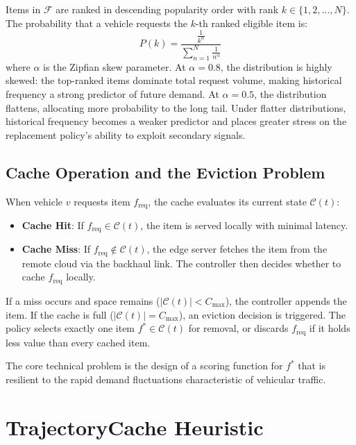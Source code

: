 \documentclass[preprint,12pt]{elsarticle}
\begin{document}
	Items in $\mathcal{F}$ are ranked in descending popularity order with rank $k \in \{1, 2, \dots, N\}$. The probability that a vehicle requests the $k$-th ranked eligible item is:
	\begin{equation}
		P(k) = \frac{\frac{1}{k^\alpha}}{\sum_{n=1}^{N} \frac{1}{n^\alpha}}
		\label{eq:zipf}
	\end{equation}
	where $\alpha$ is the Zipfian skew parameter. At $\alpha = 0.8$, the distribution is highly skewed: the top-ranked items dominate total request volume, making historical frequency a strong predictor of future demand. At $\alpha = 0.5$, the distribution flattens, allocating more probability to the long tail. Under flatter distributions, historical frequency becomes a weaker predictor and places greater stress on the replacement policy's ability to exploit secondary signals.
	
	\subsection{Cache Operation and the Eviction Problem}
	
	When vehicle $v$ requests item $f_\text{req}$, the cache evaluates its current state $\mathcal{C}(t)$:
	\begin{itemize}
		\item \textbf{Cache Hit}: If $f_\text{req} \in \mathcal{C}(t)$, the item is served locally with minimal latency.
		\item \textbf{Cache Miss}: If $f_\text{req} \notin \mathcal{C}(t)$, the edge server fetches the item from the remote cloud via the backhaul link. The controller then decides whether to cache $f_\text{req}$ locally.
	\end{itemize}
	
	If a miss occurs and space remains ($|\mathcal{C}(t)| < C_\text{max}$), the controller appends the item. If the cache is full ($|\mathcal{C}(t)| = C_\text{max}$), an eviction decision is triggered. The policy selects exactly one item $f^* \in \mathcal{C}(t)$ for removal, or discards $f_\text{req}$ if it holds less value than every cached item.
	
	The core technical problem is the design of a scoring function for $f^*$ that is resilient to the rapid demand fluctuations characteristic of vehicular traffic.
	
	\section{TrajectoryCache Heuristic}
	\label{sec:method}
	
\end{document}
